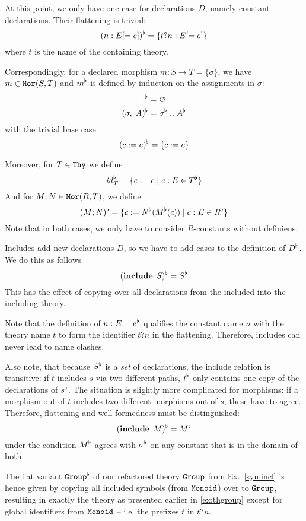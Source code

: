 At this point, we only have one case for declarations $D$, namely constant declarations.
Their flattening is trivial:
 \[(n:E[=e])^{\flat}=\{t?n:E[=e]\}\]
where $t$ is the name of the containing theory.

Correspondingly, for a declared morphism $m:S\to T=\{\sigma\}$, we have $m\in\mathtt{Mor}(S,T)$ and $m^\flat$ is defined by induction on the assignments in $\sigma$:
 \[\cdot^\flat=\varnothing\]
 \[(\sigma,\;A)^\flat=\sigma^\flat\cup A^{\flat}\]
with the trivial base case
 \[(c:=e)^{\flat}=\{c:=e\}\]
\begin{nomodexp}
Moreover, for $T\in\mathtt{Thy}$ we define
\[\mathit{id}_{T}^\flat=\{c:=c \;|\; c:E\in T^\flat\}\]
And for $M;N\in\mathtt{Mor}(R,T)$, we define
\[(M;N)^\flat=\{c:=N^\flat(M^\flat(c)) \;|\; c:E\in R^\flat\}\]
Note that in both cases, we only have to consider $R$-constants without definiens.
\end{nomodexp}

\begin{example}\label{sem:incl}
Includes add new declarations $D$, so we have to add cases to the definition of $D^{\flat}$.
We do this as follows
  \[(\operatorname{\mathbf{include}}{\;S})^{\flat} = S^\flat\]
This has the effect of copying over all declarations from the included into the including theory.

Note that the definition of $n:E=e^{\flat}$ qualifies the constant name $n$ with the theory name $t$ to form the identifier $t?n$ in the flattening.
Therefore, includes can never lead to name clashes.

Also note, that because $S^\flat$ is a \textit{set} of declarations, the include relation is transitive: if $t$ includes $s$ via two different paths, $t^\flat$ only contains one copy of the declarations of $s^\flat$.
The situation is slightly more complicated for morphisms: if a morphism out of $t$ includes two different morphisms out of $s$, these have to agree.
Therefore, flattening and well-formedness must be distinguished:
  \[(\operatorname{\mathbf{include}}{\;M})^{\flat} = M^\flat\]
under the condition $M^\flat$ agrees with $\sigma^\flat$ on any constant that is in the domain of both.

The flat variant $\operatorname{\mathtt{Group}}^\flat$ of our refactored theory $\operatorname{\mathtt{Group}}$ from Ex.~\ref{syn:incl} is hence given by copying all included symbols (from $\operatorname{\mathtt{Monoid}}$) over to $\operatorname{\mathtt{Group}}$, resulting in exactly the theory as presented earlier in \autoref{ex:thgroup} except for global identifiers from $\operatorname{\mathtt{Monoid}}$ -- i.e. the prefixes $t$ in $t?n$.
\end{example}

